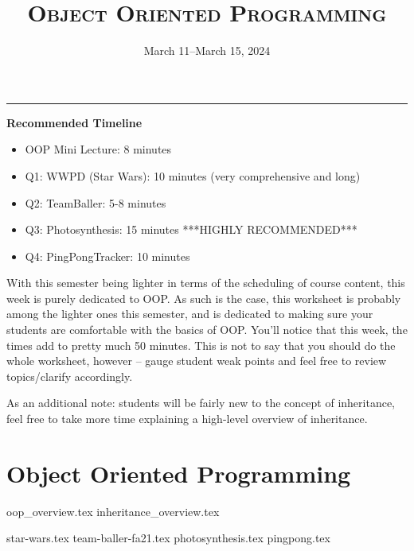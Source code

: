\documentclass{exam}
\title{\textsc{Object Oriented Programming}}
\date{March 11--March 15, 2024}
\begin{document}
	\maketitle
	\rule{\textwidth}{0.15em}

\begin{meta}
	\textbf{Recommended Timeline}
	\begin{itemize}
		\item OOP Mini Lecture: 8 minutes
		\item Q1: WWPD (Star Wars): 10 minutes (very comprehensive and long)
		\item Q2: TeamBaller: 5-8 minutes
        \item Q3: Photosynthesis: 15 minutes ***HIGHLY RECOMMENDED*** 
		\item Q4: PingPongTracker: 10 minutes
	\end{itemize}
With this semester being lighter in terms of the scheduling of course content, this week is purely dedicated to OOP. As such is the case, this worksheet is probably among the lighter ones this semester, and is dedicated to making sure your students are comfortable with the basics of OOP. You'll notice that this week, the times add to pretty much 50 minutes. This is not to say that you should do the whole worksheet, however -- gauge student weak points and feel free to review topics/clarify accordingly.

As an additional note: students will be fairly new to the concept of inheritance, feel free to take more time explaining a high-level overview of inheritance. 
\end{meta}

\section{Object Oriented Programming}
{oop_overview.tex}
{inheritance_overview.tex}
\newpage
\begin{questions}
{star-wars.tex}
\newpage
{team-baller-fa21.tex}
\newpage
{photosynthesis.tex}
\newpage
{pingpong.tex}
\end{questions}
\end{document}
